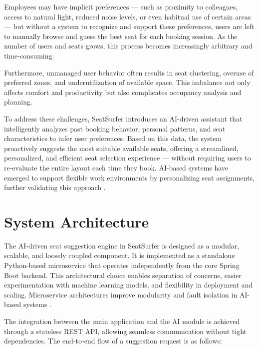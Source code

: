 \documentclass[12pt,a4paper]{report} %
\begin{document}
Employees may have implicit preferences — such as proximity to colleagues, access to natural light, reduced noise levels, or even habitual use of certain areas — but without a system to recognize and support these preferences, users are left to manually browse and guess the best seat for each booking session. As the number of users and seats grows, this process becomes increasingly arbitrary and time-consuming.

Furthermore, unmanaged user behavior often results in seat clustering, overuse of preferred zones, and underutilization of available space. This imbalance not only affects comfort and productivity but also complicates occupancy analysis and planning.

To address these challenges, SeatSurfer introduces an AI-driven assistant that intelligently analyzes past booking behavior, personal patterns, and seat characteristics to infer user preferences. Based on this data, the system proactively suggests the most suitable available seats, offering a streamlined, personalized, and efficient seat selection experience — without requiring users to re-evaluate the entire layout each time they book. AI-based systems have emerged to support flexible work environments by personalizing seat assignments, further validating this approach \cite{lu2022ai}.

\section{System Architecture}

The AI-driven seat suggestion engine in SeatSurfer is designed as a modular, scalable, and loosely coupled component. It is implemented as a standalone Python-based microservice that operates independently from the core Spring Boot backend. This architectural choice enables separation of concerns, easier experimentation with machine learning models, and flexibility in deployment and scaling. Microservice architectures improve modularity and fault isolation in AI-based systems \cite{torres2023micro}.

The integration between the main application and the AI module is achieved through a stateless REST API, allowing seamless communication without tight dependencies. The end-to-end flow of a suggestion request is as follows:
\end{document}

